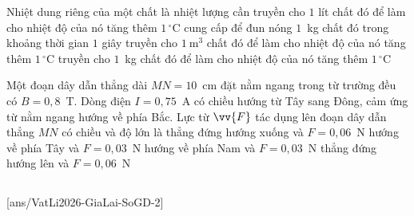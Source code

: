 	\begin{ex}%
		Nhiệt dung riêng của một chất là nhiệt lượng cần
		\choice
		{truyền cho $1$ lít chất đó để làm cho nhiệt độ của nó tăng thêm $1\,^\circ\text{C}$}
		{cung cấp để đun nóng $1$~kg chất đó trong khoảng thời gian $1$ giây}
		{truyền cho $1~\text{m}^3$ chất đó để làm cho nhiệt độ của nó tăng thêm $1\,^\circ\text{C}$}
		{\True truyền cho $1$~kg chất đó để làm cho nhiệt độ của nó tăng thêm $1\,^\circ\text{C}$}
	\end{ex}

	\begin{ex}%
		Một đoạn dây dẫn thẳng dài $MN=10$~cm đặt nằm ngang trong từ trường đều có $B=0{,}8$~T. Dòng điện $I=0{,}75$~A có chiều hướng từ Tây sang Đông, cảm ứng từ nằm ngang hướng về phía Bắc. Lực từ $\vv{F}$ tác dụng lên đoạn dây dẫn thẳng $MN$ có chiều và độ lớn là
		\choice
		{thẳng đứng hướng xuống và $F=0{,}06$~N}
		{hướng về phía Tây và $F=0{,}03$~N}
		{hướng về phía Nam và $F=0{,}03$~N}
		{\True thẳng đứng hướng lên và $F=0{,}06$~N}
	\end{ex}

	\subsection*{}
	\setcounter{ex}{0}
	[ans/VatLi2026-GiaLai-SoGD-2]

